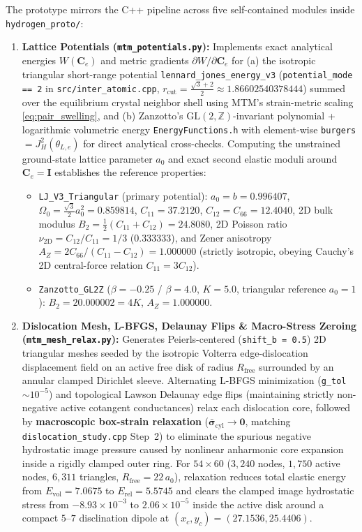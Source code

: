 \documentclass[11pt,a4paper]{article}
\newcommand{\Z}{\mathbb{Z}}
\newcommand{\code}[1]{\texttt{#1}}
\begin{document}
The prototype mirrors the C++ pipeline across five self-contained modules inside \code{hydrogen\_proto/}:
\begin{enumerate}[nosep]
  \item \textbf{Lattice Potentials (\code{mtm\_potentials.py}):} Implements exact analytical energies $W(\mathbf{C}_e)$ and metric gradients $\partial W/\partial\mathbf{C}_e$ for (a) the isotropic triangular short-range potential \code{lennard\_jones\_energy\_v3} (\code{potential\_mode == 2} in \code{src/inter\_atomic.cpp}, $r_{\text{cut}} = \frac{\sqrt{3}+2}{2} \approx 1.86602540378444$) summed over the equilibrium crystal neighbor shell using MTM's strain-metric scaling \eqref{eq:pair_swelling}, and (b) Zanzotto's $\mathrm{GL}(2,\Z)$-invariant polynomial + logarithmic volumetric energy \code{EnergyFunctions.h} with element-wise \code{burgers} $= J_H^2(\theta_{L,e})$ for direct analytical cross-checks. Computing the unstrained ground-state lattice parameter $a_0$ and exact second elastic moduli around $\mathbf{C}_e = \mathbf{I}$ establishes the reference properties:
  \begin{itemize}[nosep]
    \item \code{LJ\_V3\_Triangular} (primary potential): $a_0 = b = 0.996407$, $\Omega_0 = \frac{\sqrt{3}}{2}a_0^2 = 0.859814$, $C_{11} = 37.2120$, $C_{12} = C_{66} = 12.4040$, 2D bulk modulus $B_2 = \frac{1}{2}(C_{11}+C_{12}) = 24.8080$, 2D Poisson ratio $\nu_{2\mathrm{D}} = C_{12}/C_{11} = 1/3$ ($0.333333$), and Zener anisotropy $A_Z = 2C_{66}/(C_{11}-C_{12}) = 1.000000$ (strictly isotropic, obeying Cauchy's 2D central-force relation $C_{11} = 3C_{12}$).
    \item \code{Zanzotto\_GL2Z} ($\beta = -0.25$ / $\beta = 4.0$, $K = 5.0$, triangular reference $a_0 = 1$): $B_2 = 20.000002 = 4K$, $A_Z = 1.000000$.
  \end{itemize}
  \item \textbf{Dislocation Mesh, L-BFGS, Delaunay Flips \& Macro-Stress Zeroing (\code{mtm\_\allowbreak mesh\_\allowbreak relax.py}):} Generates Peierls-centered (\code{shift\_b = 0.5}) 2D triangular meshes seeded by the isotropic Volterra edge-dislocation displacement field on an active free disk of radius $R_{\text{free}}$ surrounded by an annular clamped Dirichlet sleeve. Alternating L-BFGS minimization (\code{g\_tol} $\sim 10^{-5}$) and topological Lawson Delaunay edge flips (maintaining strictly non-negative active cotangent conductances) relax each dislocation core, followed by \textbf{macroscopic box-strain relaxation} ($\bar{\boldsymbol{\sigma}}_{\text{cyl}} \to \mathbf{0}$, matching \code{dislocation\_\allowbreak study.cpp} Step~2) to eliminate the spurious negative hydrostatic image pressure caused by nonlinear anharmonic core expansion inside a rigidly clamped outer ring. For $54 \times 60$ ($3{,}240$ nodes, $1{,}750$ active nodes, $6{,}311$ triangles, $R_{\text{free}} = 22\,a_0$), relaxation reduces total elastic energy from $E_{\text{vol}} = 7.0675$ to $E_{\text{rel}} = 5.5745$ and clears the clamped image hydrostatic stress from $-8.93 \times 10^{-3}$ to $2.06 \times 10^{-5}$ inside the active disk around a compact $5$--$7$ disclination dipole at $(x_c, y_c) = (27.1536, 25.4406)$.

\end{enumerate}
\end{document}
